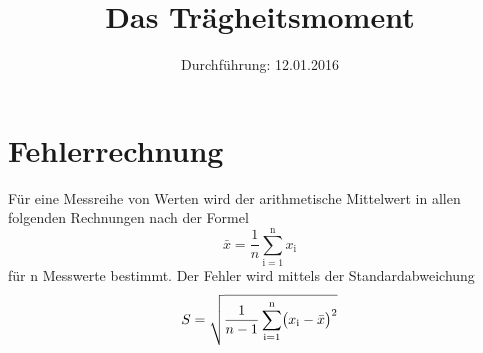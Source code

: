 

\subject{Versuchsprotokoll zum Versuch Nr. 101}
\title{Das Trägheitsmoment}
\date{
  Durchführung: 12.01.2016
}



\maketitle
\newpage




\section{Fehlerrechnung}
\label{sec:fehler}
Für eine Messreihe von Werten wird der arithmetische Mittelwert in allen folgenden Rechnungen nach der Formel
\begin{equation}
  \bar{x} = \frac{1}{n} \sum_{\text{i}=1}^\text{n} x_\text{i}
  \label{eqn:mittelwert}
\end{equation}
für n Messwerte bestimmt.
Der Fehler wird mittels der Standardabweichung
\begin{equation}
  S = \sqrt{ \frac{1}{n-1} \sum_{\text{i}=1}^\text{n}  \bigl(x_\text{i} - \bar{x} \bigr)^2  }\\
    \label{eqn:abw}
\end{equation}


